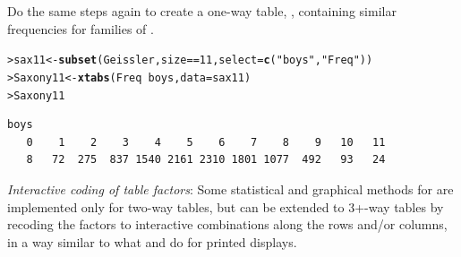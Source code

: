 \documentclass[10pt]{report}\usepackage[]{graphicx}\usepackage[]{color}
\makeatletter
\newcommand{\hlnum}[1]{\textcolor[rgb]{0.686,0.059,0.569}{#1}}%
\newcommand{\hlstr}[1]{\textcolor[rgb]{0.192,0.494,0.8}{#1}}%
\newcommand{\hlopt}[1]{\textcolor[rgb]{0,0,0}{#1}}%
\newcommand{\hlstd}[1]{\textcolor[rgb]{0.345,0.345,0.345}{#1}}%
\newcommand{\hlkwb}[1]{\textcolor[rgb]{0.69,0.353,0.396}{#1}}%
\newcommand{\hlkwc}[1]{\textcolor[rgb]{0.333,0.667,0.333}{#1}}%
\newcommand{\hlkwd}[1]{\textcolor[rgb]{0.737,0.353,0.396}{\textbf{#1}}}%
\newenvironment{kframe}{%
 \def\at@end@of@kframe{}%
 \ifinner\ifhmode%
  \def\at@end@of@kframe{\end{minipage}}%
  \begin{minipage}{\columnwidth}%
 \fi\fi%
 \def\FrameCommand##1{\hskip\@totalleftmargin \hskip-\fboxsep
 \colorbox{shadecolor}{##1}\hskip-\fboxsep
     \hskip-\linewidth \hskip-\@totalleftmargin \hskip\columnwidth}%
 \MakeFramed {\advance\hsize-\width
   \@totalleftmargin\z@ \linewidth\hsize
   \@setminipage}}%
 {\par\unskip\endMakeFramed%
 \at@end@of@kframe}
\newenvironment{knitrout}{}{} %
\renewenvironment{knitrout}{\small\renewcommand{\baselinestretch}{.85}}{} %
\makeatother
\begin{document}
\begin{Exercises}
\begin{enumerate*}
    \item Do the same steps again to create a one-way table, ,
    containing similar frequencies for families of .
    \begin{ans}
\begin{knitrout}\footnotesize
{}\color{fgcolor}\begin{kframe}
\begin{alltt}
\hlstd{> }\hlstd{sax11} \hlkwb{<-} \hlkwd{subset}\hlstd{(Geissler, size}\hlopt{==}\hlnum{11}\hlstd{,} \hlkwc{select} \hlstd{=} \hlkwd{c}\hlstd{(}\hlstr{"boys"}\hlstd{,}\hlstr{"Freq"}\hlstd{))}
\hlstd{> }\hlstd{Saxony11} \hlkwb{<-} \hlkwd{xtabs}\hlstd{(Freq}\hlopt{~}\hlstd{boys,} \hlkwc{data}\hlstd{=sax11)}
\hlstd{> }\hlstd{Saxony11}
\end{alltt}
\begin{verbatim}
boys
   0    1    2    3    4    5    6    7    8    9   10   11 
   8   72  275  837 1540 2161 2310 1801 1077  492   93   24 
\end{verbatim}
\end{kframe}
\end{knitrout}
    \end{ans}
    
  \end{enumerate*}

\exercise\exhard \emph{Interactive coding of table factors}:  Some statistical and graphical
methods for \ctabs are implemented only for two-way tables, but can be extended
to 3+-way tables by recoding the factors to interactive combinations along the
rows and/or columns, in a way similar to what  and 
do for printed displays.


\end{Exercises}
\end{document}
